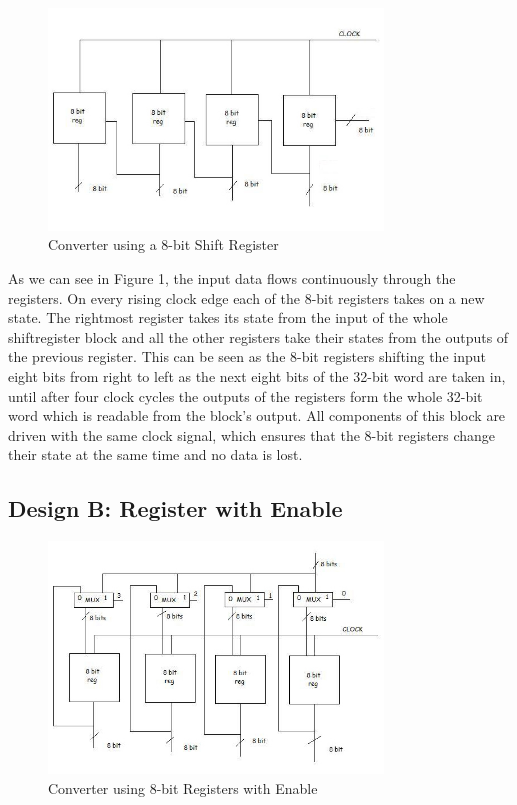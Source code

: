 \documentclass[11pt,a4paper]{article}
\begin{document}
\begin{figure}[htp]
\centering
\includegraphics[width = 3.5in]{./images/shiftregister.jpg}
\caption{Converter using a 8-bit Shift Register}
\end{figure}

As we can see in Figure 1, the input data flows continuously through the registers. On every rising clock edge each of the 8-bit registers takes on a new state. The rightmost register takes its state from the input of the whole shiftregister block and all the other registers take their states from the outputs of the previous register. This can be seen as the 8-bit registers shifting the input eight bits from right to left as the next eight bits of the 32-bit word are taken in, until after four clock cycles the outputs of the registers form the whole 32-bit word which is readable from the block's output. All components of this block are driven with the same clock signal, which ensures that the 8-bit registers change their state at the same time and no data is lost. 


\subsection{Design B: Register with Enable}

\begin{figure}[htp]
\centering
\includegraphics[width = 3.5in]{./images/shiftregisterenable.jpg}
\caption{Converter using 8-bit Registers with Enable}
\end{figure}
\end{document}
